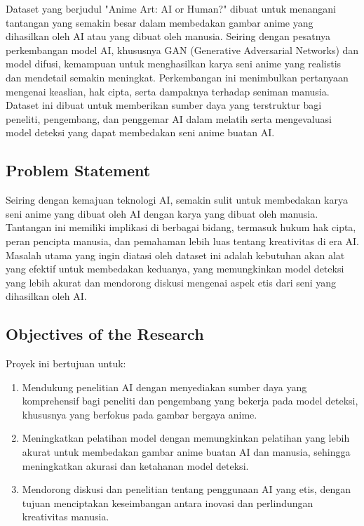 \documentclass[12pt,a4paper]{article}
\begin{document}
Dataset yang berjudul "Anime Art: AI or Human?" dibuat untuk menangani tantangan yang semakin besar dalam membedakan gambar anime yang dihasilkan oleh AI atau yang dibuat oleh manusia. Seiring dengan pesatnya perkembangan model AI, khususnya GAN (Generative Adversarial Networks) dan model difusi, kemampuan untuk menghasilkan karya seni anime yang realistis dan mendetail semakin meningkat. Perkembangan ini menimbulkan pertanyaan mengenai keaslian, hak cipta, serta dampaknya terhadap seniman manusia. Dataset ini dibuat untuk memberikan sumber daya yang terstruktur bagi peneliti, pengembang, dan penggemar AI dalam melatih serta mengevaluasi model deteksi yang dapat membedakan seni anime buatan AI.

\subsection{Problem Statement}
Seiring dengan kemajuan teknologi AI, semakin sulit untuk membedakan karya seni anime yang dibuat oleh AI dengan karya yang dibuat oleh manusia. Tantangan ini memiliki implikasi di berbagai bidang, termasuk hukum hak cipta, peran pencipta manusia, dan pemahaman lebih luas tentang kreativitas di era AI. Masalah utama yang ingin diatasi oleh dataset ini adalah kebutuhan akan alat yang efektif untuk membedakan keduanya, yang memungkinkan model deteksi yang lebih akurat dan mendorong diskusi mengenai aspek etis dari seni yang dihasilkan oleh AI.

\subsection{Objectives of the Research}
Proyek ini bertujuan untuk:

\begin{enumerate}
   \item Mendukung penelitian AI dengan menyediakan sumber daya yang komprehensif bagi peneliti dan pengembang yang bekerja pada model deteksi, khususnya yang berfokus pada gambar bergaya anime.
        \item Meningkatkan pelatihan model dengan memungkinkan pelatihan yang lebih akurat untuk membedakan gambar anime buatan AI dan manusia, sehingga meningkatkan akurasi dan ketahanan model deteksi.
        \item Mendorong diskusi dan penelitian tentang penggunaan AI yang etis, dengan tujuan menciptakan keseimbangan antara inovasi dan perlindungan kreativitas manusia.
\end{enumerate}
\newpage
\end{document}
